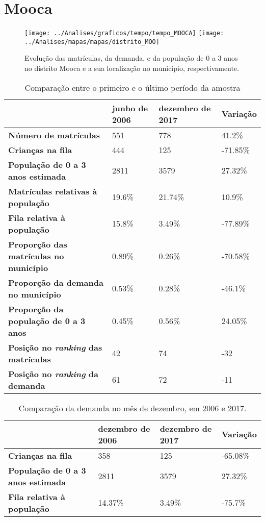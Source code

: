 \section{Mooca}
\begin{figure}[H]
	\centering
	\texttt{[image: ../Analises/graficos/tempo/tempo\_MOOCA]}
	\texttt{[image: ../Analises/mapas/mapas/distrito\_MOO]}
	\caption{Evolução das matrículas, da demanda, e da população de 0 a 3 anos no distrito Mooca e a sua localização no município, respectivamente.}
\end{figure}
\begin{table}[H]
	\begin{tabular}{|l|l|l|l|}
		\hline
		\textbf{}                                      & \textbf{junho de 2006}       & \textbf{dezembro de 2017}    & \textbf{Variação} \\ \hline
		\textbf{Número de matrículas}                  & 551 & 778 & 41.2\% \\ \hline
		\textbf{Crianças na fila}                      & 444 & 125 & -71.85\% \\ \hline
		\textbf{População de 0 a 3 anos estimada}      & 2811 & 3579 & 27.32\% \\ \hline
		\textbf{Matrículas relativas à população}      & 19.6\% & 21.74\% & 10.9\% \\ \hline
		\textbf{Fila relativa à população}             & 15.8\% & 3.49\% & -77.89\% \\ \hline
		\textbf{Proporção das matrículas no município} & 0.89\% & 0.26\% & -70.58\% \\ \hline
		\textbf{Proporção da demanda no município}     & 0.53\% & 0.28\% & -46.1\% \\ \hline
		\textbf{Proporção da população de 0 a 3 anos}  & 0.45\% & 0.56\% & 24.05\% \\ \hline
		\textbf{Posição no \textit{ranking} das matrículas}     & 42 & 74 & -32 \\ \hline
		\textbf{Posição no \textit{ranking} da demanda}         & 61 & 72 & -11 \\ \hline
	\end{tabular}
	\caption{Comparação entre o primeiro e o último período da amostra}
\end{table}
\begin{table}[H]
	\begin{tabular}{|l|l|l|l|}
		\hline
		\textbf{}                                 & \textbf{dezembro de 2006} & \textbf{dezembro de 2017} & \textbf{Variação} \\ \hline
		\textbf{Crianças na fila}                      & 358 & 125 & -65.08\% \\ \hline
		\textbf{População de 0 a 3 anos estimada}      & 2811 & 3579 & 27.32\% \\ \hline
		\textbf{Fila relativa à população}             & 14.37\% & 3.49\% & -75.7\% \\ \hline
	\end{tabular}
	\caption{Comparação da demanda no mês de dezembro, em 2006 e 2017.}
\end{table}

